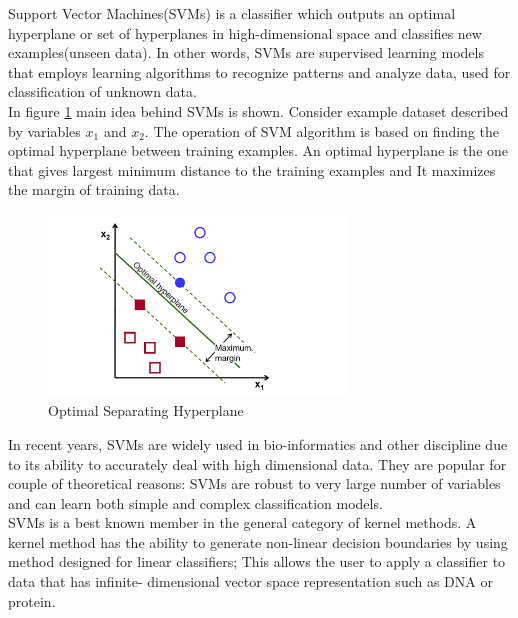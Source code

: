 
Support Vector Machines(SVMs) is a classifier which outputs an optimal hyperplane or set of hyperplanes in high-dimensional space and classifies new examples(unseen data). In other words, SVMs are supervised learning models that employs learning algorithms to recognize patterns and analyze data, used for classification of unknown data\cite{wiki:SVM}.\\
In figure \ref{fig:SVM} main idea behind SVMs is shown. Consider example dataset described by variables $x_1$ and $x_2$. The operation of SVM algorithm is based on finding the optimal hyperplane between training examples. An optimal hyperplane is the one that gives largest minimum distance to the training examples and It maximizes the margin of training data\cite{opencv_library}.

\begin{figure}[H]
    \includegraphics[width=80mm]{./img/SVM.png}
     \caption{Optimal Separating Hyperplane}
    \label{fig:SVM}
\end{figure}

In recent years, SVMs are widely used in bio-informatics \cite{furey2000support,osuna1997training,guyon2002gene} and other discipline due to its ability to accurately deal with high dimensional data\cite{joachims1998text}. They are popular for couple of theoretical reasons: SVMs are robust to very large number of variables and can learn both simple and complex classification models\cite{cristianini2000}.\\

SVMs is a best known member in the general category of kernel methods\cite{shawe2004kernel}. A kernel method has the ability to generate non-linear decision boundaries by using method designed for linear classifiers; This allows the user to apply a classifier to data that has infinite- dimensional vector space representation such as DNA or protein\cite{ben2010user}.    




